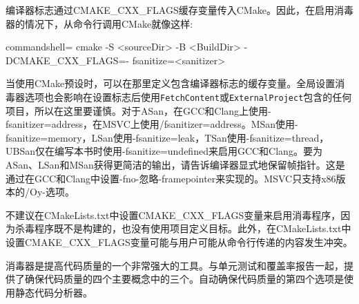 编译器标志通过CMAKE\_CXX\_FLAGS缓存变量传入CMake。因此，在启用消毒器的情况下，从命令行调用CMake就像这样:

\begin{tcblisting}{commandshell={}}
cmake -S <sourceDir> -B <BuildDir> -DCMAKE_CXX_FLAGS=-
  fsanitize=<sanitizer>
\end{tcblisting}

当使用CMake预设时，可以在那里定义包含编译器标志的缓存变量。全局设置消毒器选项也会影响在设置标志后使用\texttt{FetchContent}或\texttt{ExternalProject}包含的任何项目，所以在这里要谨慎。对于ASan，在GCC和Clang上使用-fsanitizer=address，在MSVC上使用/fsanitizer=address。MSan使用-fsanitize=memory，LSan使用-fsanitize=leak，TSan使用-fsanitize=thread，UBSan仅在编写本书时使用-fsanitize=undefined来启用GCC和Clang。要为ASan、LSan和MSan获得更简洁的输出，请告诉编译器显式地保留帧指针。这是通过在GCC和Clang中设置-fno-忽略-framepointer来实现的。MSVC只支持x86版本的/Oy-选项。

\begin{tcolorbox}[colback=webgreen!5!white,colframe=webgreen!75!black,title=Note]
不建议在CMakeLists.txt中设置CMAKE\_CXX\_FLAGS变量来启用消毒程序，因为杀毒程序既不是构建的，也没有使用项目定义目标。此外，在CMakeLists.txt中设置CMAKE\_CXX\_FLAGS变量可能与用户可能从命令行传递的内容发生冲突。
\end{tcolorbox}

消毒器是提高代码质量的一个非常强大的工具。与单元测试和覆盖率报告一起，提供了确保代码质量的四个主要概念中的三个。自动确保代码质量的第四个选项是使用静态代码分析器。

































